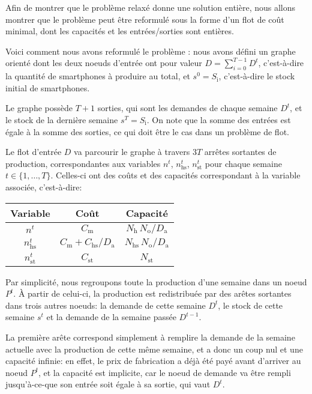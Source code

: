 Afin de montrer que le problème relaxé donne une solution entière, nous allons montrer que le problème peut être reformulé sous la forme d'un flot de coût minimal, dont les capacités et les entrées/sorties sont entières.

Voici comment nous avons reformulé le problème : nous avons défini un graphe orienté dont les deux noeuds d'entrée ont pour valeur $D=\sum_{i=0}^{T-1} D^t$, c'est-à-dire la quantité de smartphones à produire au total, et $s^0 = S_\mathrm{i}$, c'est-à-dire le stock initial de smartphones.

Le graphe possède $T+1$ sorties, qui sont les demandes de chaque semaine $D^t$, et le stock de la dernière semaine $s^T = S_\mathrm{i}$. On note que la somme des entrées est égale à la somme des sorties, ce qui doit être le cas dans un problème de flot.

Le flot d'entrée $D$ va parcourir le graphe à travers $3T$ arrêtes sortantes de \og{}production\fg{}, correspondantes aux variables $n^t$, $n_\mathrm{hs}^t$, $n_\mathrm{st}^t$ pour chaque semaine $t \in \{1,\dots,T\}$. Celles-ci ont des coûts et des capacités correspondant à la variable associée, c'est-à-dire:
\begin{center}
\begin{tabular}{c|cc}
    \textbf{Variable} & \textbf{Coût} & \textbf{Capacité} \\
    \hline
    $n^t$ & $C_\mathrm{m}$ & $N_\mathrm{h}\,N_\mathrm{o}/D_\mathrm{a}$ \\
    \hline
    $n_\mathrm{hs}^t$ & $C_\mathrm{m}+C_\mathrm{hs}/D_\mathrm{a}$ & $N_\mathrm{hs}\,N_\mathrm{o}/D_\mathrm{a}$ \\
    \hline
    $n_\mathrm{st}^t$ & $C_\mathrm{st}$ & $N_\mathrm{st}$ \\
\end{tabular}
\end{center}

Par simplicité, nous regroupons toute la production d'une semaine dans un noeud $P^t$. À partir de celui-ci, la production est redistribuée par des arêtes sortantes dans trois autres noeuds: la demande de cette semaine $D^t$, le stock de cette semaine $s^t$ et la demande de la semaine passée $D^{t-1}$.

La première arête correspond simplement à remplire la demande de la semaine actuelle avec la production de cette même semaine, et a donc un coup nul et une capacité infinie: en effet, le prix de fabrication a déjà été payé avant d'arriver au noeud $P^t$, et la capacité est implicite, car le noeud de demande va être rempli jusqu'à-ce-que son entrée soit égale à sa sortie, qui vaut $D^t$.

